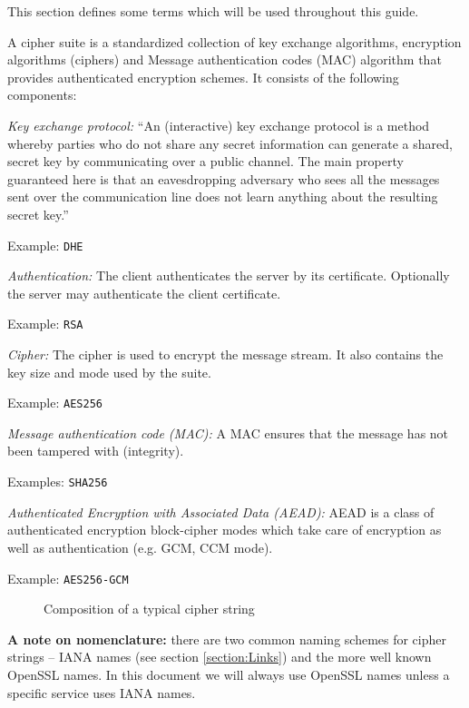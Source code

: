 
This section defines some terms which will be used throughout this guide.


A cipher suite is a standardized collection of key exchange algorithms, encryption 
algorithms (ciphers) and Message authentication codes (MAC) algorithm that provides
authenticated encryption schemes. It consists of the following components:

\begin{description}

\item{\it Key exchange protocol:}
``An (interactive) key exchange protocol is a method whereby parties who do not 
share any secret information can generate a shared, secret key by communicating 
over a public channel. The main property guaranteed here is that an 
eavesdropping adversary who sees all the messages sent over the communication 
line does not learn anything about the resulting secret key.'' \cite{katz2008introduction}

Example: \texttt{DHE}

\item{\it Authentication:}
The client authenticates the server by its certificate. Optionally the server 
may authenticate the client certificate.

Example: \texttt{RSA}

\item{\it Cipher:}
The cipher is used to encrypt the message stream. It also contains the key size
and mode used by the suite.

Example: \texttt{AES256}

\item{\it Message authentication code (MAC):}
A MAC ensures that the message has not been tampered with (integrity).

Examples: \texttt{SHA256}

\item{\it Authenticated Encryption with Associated Data (AEAD):}
AEAD is a class of authenticated encryption block-cipher modes
which take care of encryption as well as authentication (e.g. GCM, CCM mode). 

Example: \texttt{AES256-GCM}



\begin{figure}[h]
\caption{Composition of a typical cipher string}
\end{figure}

\item {\textbf{A note on nomenclature:}} there are two common naming schemes for cipher strings -- IANA names (see section \ref{section:Links}) and the more well known OpenSSL names. In this document we will always use OpenSSL names unless a specific service uses IANA names.

\end{description}
